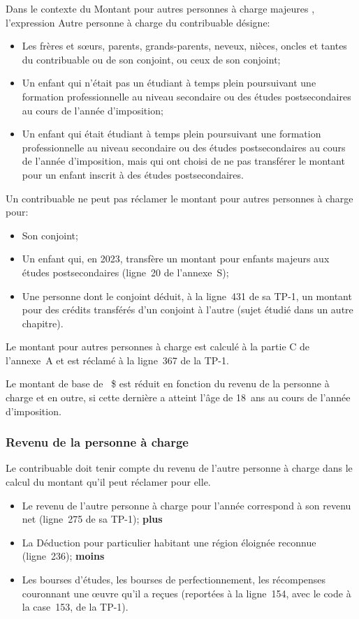 Dans le contexte du \og Montant pour autres personnes à charge majeures \fg{}, l'expression \og Autre personne à charge du contribuable \fg{} désigne:
\begin{itemize}
	\item Les frères et sœurs, parents, grands-parents, neveux, nièces, oncles et tantes du contribuable ou de son conjoint, ou ceux de son conjoint;
	\item Un enfant qui n'était pas un étudiant à temps plein poursuivant une formation professionnelle au niveau secondaire ou des études postsecondaires au cours de l'année d'imposition;
	\item Un enfant qui était étudiant à temps plein poursuivant une formation professionnelle au niveau secondaire ou des études postsecondaires au cours de l'année d'imposition, mais qui ont choisi de ne pas transférer le montant pour un enfant inscrit à des études postsecondaires.
\end{itemize}

Un contribuable ne peut pas réclamer le montant pour autres personnes à charge pour:
\begin{itemize}
	\item Son conjoint;
	\item Un enfant qui, en 2023, transfère un montant pour enfants majeurs aux études postsecondaires (ligne~20 de l'annexe~S);
	\item Une personne dont le conjoint déduit, à la ligne~431 de sa TP-1, un montant pour des crédits transférés d'un conjoint à l'autre (sujet étudié dans un autre chapitre).
\end{itemize}

Le montant pour autres personnes à charge est calculé à la partie C de l'annexe~A et est réclamé à la ligne~367 de la TP-1. 

Le montant de base de ~\$ est réduit en fonction du revenu de la personne à charge et en outre, si cette dernière a atteint l'âge de 18~ans au cours de l'année d'imposition.

\subsubsection{Revenu de la personne à charge}
Le contribuable doit tenir compte du revenu de l'autre personne à charge dans le calcul du montant qu'il peut réclamer pour elle.
\begin{itemize}
	\item Le revenu de l'autre personne à charge pour l'année correspond à son revenu net (ligne~275 de sa TP-1); \textbf{plus}
	\item La \og Déduction pour particulier habitant une région éloignée reconnue \fg{} (ligne~236); \textbf{moins}
	\item Les bourses d'études, les bourses de perfectionnement, les récompenses couronnant une œuvre qu'il a reçues (reportées à la ligne~154, avec le code  \fg{} à la case~153, de la TP-1).
\end{itemize}

